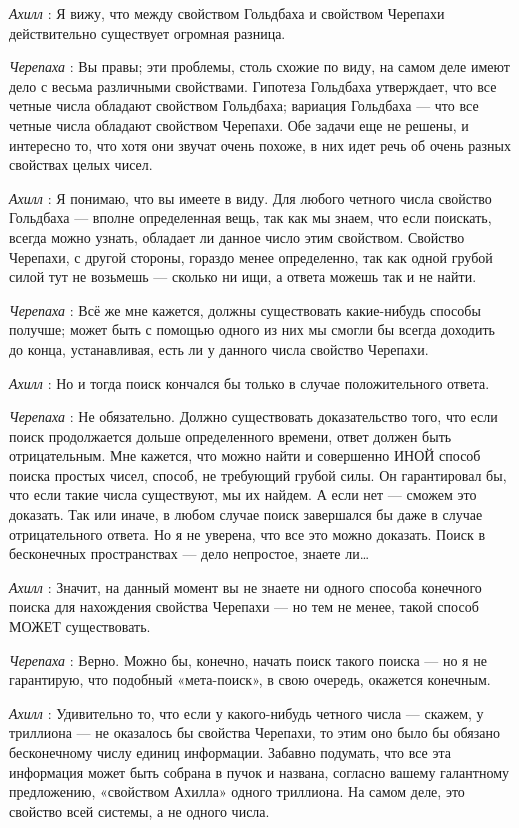 \documentclass[../main.tex]{subfiles}
\begin{document}
\begin{dialogue}
\emph{Ахилл} : Я вижу, что между свойством Гольдбаха и свойством Черепахи действительно существует огромная разница.

\emph{Черепаха} : Вы правы; эти проблемы, столь схожие по виду, на самом деле имеют дело с весьма различными свойствами. Гипотеза Гольдбаха утверждает, что все четные числа обладают свойством Гольдбаха; вариация Гольдбаха --- что все четные числа обладают свойством Черепахи. Обе задачи еще не решены, и интересно то, что хотя они звучат очень похоже, в них идет речь об очень разных свойствах целых чисел.

\emph{Ахилл} : Я понимаю, что вы имеете в виду. Для любого четного числа свойство Гольдбаха --- вполне определенная вещь, так как мы знаем, что если поискать, всегда можно узнать, обладает ли данное число этим свойством. Свойство Черепахи, с другой стороны, гораздо менее определенно, так как одной грубой силой тут не возьмешь --- сколько ни ищи, а ответа можешь так и не найти.

\emph{Черепаха} : Всё же мне кажется, должны существовать какие-нибудь способы получше; может быть с помощью одного из них мы смогли бы всегда доходить до конца, устанавливая, есть ли у данного числа свойство Черепахи.

\emph{Ахилл} : Но и тогда поиск кончался бы только в случае положительного ответа.

\emph{Черепаха} : Не обязательно. Должно существовать доказательство того, что если поиск продолжается дольше определенного времени, ответ должен быть отрицательным. Мне кажется, что можно найти и совершенно ИНОЙ способ поиска простых чисел, способ, не требующий грубой силы. Он гарантировал бы, что если такие числа существуют, мы их найдем. А если нет --- сможем это доказать. Так или иначе, в любом случае поиск завершался бы даже в случае отрицательного ответа. Но я не уверена, что все это можно доказать. Поиск в бесконечных пространствах --- дело непростое, знаете ли\ldots{}

\emph{Ахилл} : Значит, на данный момент вы не знаете ни одного способа конечного поиска для нахождения свойства Черепахи --- но тем не менее, такой способ МОЖЕТ существовать.

\emph{Черепаха} : Верно. Можно бы, конечно, начать поиск такого поиска --- но я не гарантирую, что подобный «мета-поиск», в свою очередь, окажется конечным.

\emph{Ахилл} : Удивительно то, что если у какого-нибудь четного числа --- скажем, у триллиона --- не оказалось бы свойства Черепахи, то этим оно было бы обязано бесконечному числу единиц информации. Забавно подумать, что все эта информация может быть собрана в пучок и названа, согласно вашему галантному предложению, «свойством Ахилла» одного триллиона. На самом деле, это свойство всей системы, а не одного числа.


\end{dialogue}
\end{document}
